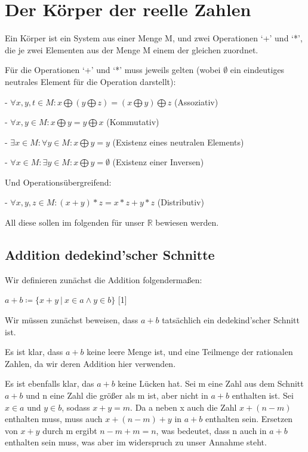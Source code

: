 \documentclass[12pt]{article}
\begin{document}
    \section{}

    \section{Der Körper der reelle Zahlen}

    Ein Körper ist ein System aus einer Menge M, und zwei Operationen `+' und `*', die je zwei Elementen aus der Menge
    M einem der gleichen zuordnet.

    Für die Operationen `+' und `*' muss jeweils gelten (wobei $\emptyset$ ein eindeutiges neutrales Element für
    die Operation darstellt):

    - $\forall x, y, t \in M: x \bigoplus (y \bigoplus z) = (x \bigoplus y) \bigoplus z$  (Assoziativ)

    - $\forall x, y \in M: x \bigoplus y = y \bigoplus x$  (Kommutativ)

    - $\exists x \in M: \forall y \in M: x \bigoplus y = y$  (Existenz eines neutralen Elements)

    - $\forall x \in M: \exists y \in M: x \bigoplus y = \emptyset$  (Existenz einer Inversen)

    Und Operationsübergreifend:

    - $\forall x, y, z \in M: (x + y) * z = x * z + y * z$ (Distributiv)

    All diese sollen im folgenden für unser $\mathbb{R}$ bewiesen werden.

    \subsection{Addition dedekind'scher Schnitte}

    Wir definieren zunächst die Addition folgendermaßen:

    $a + b \coloneqq \{x + y \mspace{4mu} | \mspace{4mu} x \in a \land y \in b\}$ [1]

    Wir müssen zunächst beweisen, dass $a + b$ tatsächlich ein dedekind'scher Schnitt ist.

    Es ist klar, dass $a + b$ keine leere Menge ist, und eine Teilmenge der rationalen Zahlen, da wir deren Addition
    hier verwenden.

    Es ist ebenfalls klar, das $a + b$ keine Lücken hat.
    Sei m eine Zahl aus dem Schnitt $a + b$ und n eine Zahl die größer als m ist, aber nicht in $a + b$ enthalten ist.
    Sei $x \in a$ und $y \in b$, sodass $x + y = m$. Da a neben x auch die Zahl $x + (n - m)$ enthalten muss,
    muss auch $x + (n - m) + y$ in $a + b$ enthalten sein. Ersetzen von $x + y$ durch m ergibt $n - m + m = n$,
    was bedeutet, dass n auch in $a + b$ enthalten sein muss, was aber im widerspruch zu unser Annahme steht.
\end{document}
